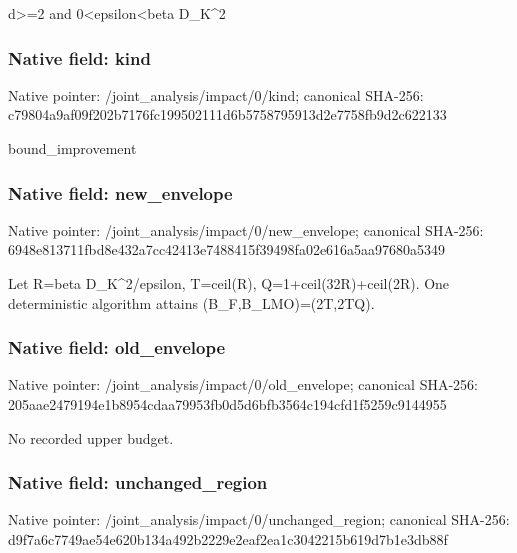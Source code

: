 \documentclass[10pt,a4paper]{article}
\begin{document}
\begingroup\raggedright\sloppy d>=\allowbreak{}2 and 0<epsilon<beta D\_\allowbreak{}K\textasciicircum{}2\par\endgroup

\subsubsection{Native field: kind}
Native pointer: /joint\_\allowbreak{}analysis/impact/0/kind; canonical SHA-256: c79804a9af09f202b7176fc199502111d6b5758795913d2e7758fb9d2c622133

\begingroup\raggedright\sloppy bound\_\allowbreak{}improvement\par\endgroup

\subsubsection{Native field: new\_\allowbreak{}envelope}
Native pointer: /joint\_\allowbreak{}analysis/impact/0/new\_\allowbreak{}envelope; canonical SHA-256: 6948e813711fbd8e432a7cc42413e7488415f39498fa02e616a5aa97680a5349

\begingroup\raggedright\sloppy Let R=\allowbreak{}beta D\_\allowbreak{}K\textasciicircum{}2/\allowbreak{}epsilon,\allowbreak{} T=\allowbreak{}ceil(R),\allowbreak{} Q=\allowbreak{}1+ceil(32R)+ceil(2R). One deterministic algorithm attains (B\_\allowbreak{}F,\allowbreak{}B\_\allowbreak{}LMO)=\allowbreak{}(2T,\allowbreak{}2TQ).\par\endgroup

\subsubsection{Native field: old\_\allowbreak{}envelope}
Native pointer: /joint\_\allowbreak{}analysis/impact/0/old\_\allowbreak{}envelope; canonical SHA-256: 205aae2479194e1b8954cdaa79953fb0d5d6bfb3564c194cfd1f5259c9144955

\begingroup\raggedright\sloppy No recorded upper budget.\par\endgroup

\subsubsection{Native field: unchanged\_\allowbreak{}region}
Native pointer: /joint\_\allowbreak{}analysis/impact/0/unchanged\_\allowbreak{}region; canonical SHA-256: d9f7a6c7749ae54e620b134a492b2229e2eaf2ea1c3042215b619d7b1e3db88f
\end{document}

